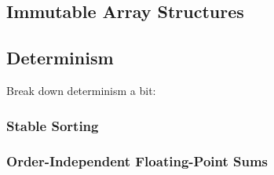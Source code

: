 \subsection{Immutable Array Structures}

\subsection{Determinism}

Break down determinism a bit:

\subsubsection{Stable Sorting}

\subsubsection{Order-Independent Floating-Point Sums}

